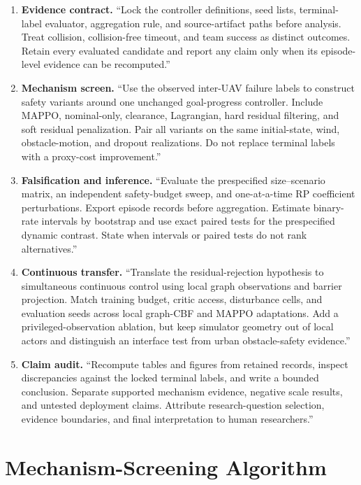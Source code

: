 \documentclass{article}
\begin{document}
\begin{enumerate}
\item \textbf{Evidence contract.} ``Lock the controller definitions, seed lists, terminal-label evaluator, aggregation rule, and source-artifact paths before analysis. Treat collision, collision-free timeout, and team success as distinct outcomes. Retain every evaluated candidate and report any claim only when its episode-level evidence can be recomputed.''

\item \textbf{Mechanism screen.} ``Use the observed inter-UAV failure labels to construct safety variants around one unchanged goal-progress controller. Include MAPPO, nominal-only, clearance, Lagrangian, hard residual filtering, and soft residual penalization. Pair all variants on the same initial-state, wind, obstacle-motion, and dropout realizations. Do not replace terminal labels with a proxy-cost improvement.''

\item \textbf{Falsification and inference.} ``Evaluate the prespecified size--scenario matrix, an independent safety-budget sweep, and one-at-a-time RP coefficient perturbations. Export episode records before aggregation. Estimate binary-rate intervals by bootstrap and use exact paired tests for the prespecified dynamic contrast. State when intervals or paired tests do not rank alternatives.''

\item \textbf{Continuous transfer.} ``Translate the residual-rejection hypothesis to simultaneous continuous control using local graph observations and barrier projection. Match training budget, critic access, disturbance cells, and evaluation seeds across local graph-CBF and MAPPO adaptations. Add a privileged-observation ablation, but keep simulator geometry out of local actors and distinguish an interface test from urban obstacle-safety evidence.''

\item \textbf{Claim audit.} ``Recompute tables and figures from retained records, inspect discrepancies against the locked terminal labels, and write a bounded conclusion. Separate supported mechanism evidence, negative scale results, and untested deployment claims. Attribute research-question selection, evidence boundaries, and final interpretation to human researchers.''
\end{enumerate}

\section{Mechanism-Screening Algorithm}
\end{document}
